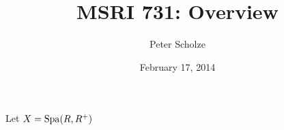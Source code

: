 \documentclass{article}
\title{MSRI 731: Overview}
\author{Peter Scholze}
\date{February 17, 2014}
\begin{document}
\maketitle





Let $X=\operatorname{Spa}(R,R^+)$
\end{document}
